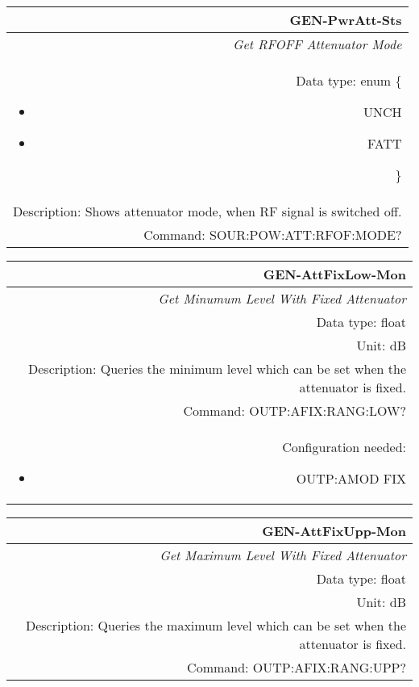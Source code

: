 \documentclass[openany]{article}
\begin{document}
		\begin{tabular}{N}
			\hline
			\bfseries GEN-PwrAtt-Sts \\ \hline
			\emph{Get RFOFF Attenuator Mode} \\
			Data type: enum \{\begin{itemize}[noitemsep]
				\small
				\item[] UNCH
				\item[] FATT
			\end{itemize}\} \\
			Description: Shows attenuator mode, when RF signal is switched off. \\
			Command: SOUR:POW:ATT:RFOF:MODE? \\

		\end{tabular}
%
		\begin{tabular}{N}
			\hline
			\bfseries GEN-AttFixLow-Mon \\ \hline
			\emph{Get Minumum Level With Fixed Attenuator} \\
			Data type: float \\
			Unit: dB \\
			Description: Queries the minimum level which can be set when the attenuator is fixed. \\
			Command: OUTP:AFIX:RANG:LOW? \\
			Configuration needed: \begin{itemize}[noitemsep]
				\small
				\item[] OUTP:AMOD FIX
			\end{itemize} \\

		\end{tabular}
%
		\begin{tabular}{N}
			\hline
			\bfseries GEN-AttFixUpp-Mon \\ \hline
			\emph{Get Maximum Level With Fixed Attenuator} \\
			Data type: float \\
			Unit: dB \\
			Description: Queries the maximum level which can be set when the attenuator is fixed. \\
			Command: OUTP:AFIX:RANG:UPP? \\

		\end{tabular}
\end{document}
